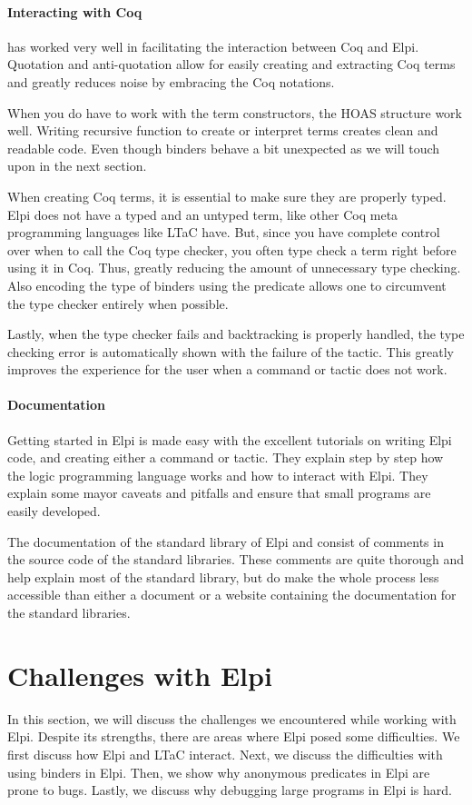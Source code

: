 \documentclass[thesis.tex]{subfiles}
\begin{document}
\paragraph{Interacting with Coq}
\ce has worked very well in facilitating the interaction between Coq and Elpi. Quotation and anti-quotation allow for easily creating and extracting Coq terms and greatly reduces noise by embracing the Coq notations.

When you do have to work with the term constructors, the HOAS structure work well. Writing recursive function to create or interpret terms creates clean and readable code. Even though binders behave a bit unexpected as we will touch upon in the next section.

When creating Coq terms, it is essential to make sure they are properly typed. Elpi does not have a typed and an untyped term, like other Coq meta programming languages like LTaC have. But, since you have complete control over when to call the Coq type checker, you often type check a term right before using it in Coq. Thus, greatly reducing the amount of unnecessary type checking. Also encoding the type of binders using the  predicate allows one to circumvent the type checker entirely when possible.

Lastly, when the type checker fails and backtracking is properly handled, the type checking error is automatically shown with the failure of the tactic. This greatly improves the experience for the user when a command or tactic does not work.

\paragraph{Documentation}
Getting started in Elpi is made easy with the excellent tutorials on writing Elpi code, and creating either a command or tactic. They explain step by step how the logic programming language works and how to interact with Elpi. They explain some mayor caveats and pitfalls and ensure that small programs are easily developed.

The documentation of the standard library of Elpi and \ce consist of comments in the source code of the standard libraries. These comments are quite thorough and help explain most of the standard library, but do make the whole process less accessible than either a document or a website containing the documentation for the standard libraries.

\section{Challenges with Elpi}\label{sec:elpibad}
In this section, we will discuss the challenges we encountered while working with Elpi. Despite its strengths, there are areas where Elpi posed some difficulties. We first discuss how Elpi and LTaC interact. Next, we discuss the difficulties with using binders in Elpi. Then, we show why anonymous predicates in Elpi are prone to bugs. Lastly, we discuss why debugging large programs in Elpi is hard.
\end{document}
